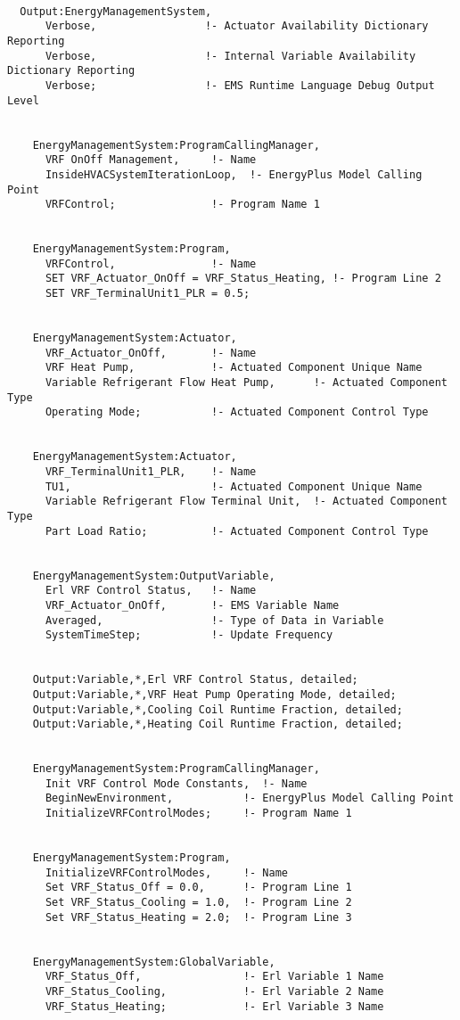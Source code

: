 \begin{lstlisting}

  Output:EnergyManagementSystem,
      Verbose,                 !- Actuator Availability Dictionary Reporting
      Verbose,                 !- Internal Variable Availability Dictionary Reporting
      Verbose;                 !- EMS Runtime Language Debug Output Level


    EnergyManagementSystem:ProgramCallingManager,
      VRF OnOff Management,     !- Name
      InsideHVACSystemIterationLoop,  !- EnergyPlus Model Calling Point
      VRFControl;               !- Program Name 1


    EnergyManagementSystem:Program,
      VRFControl,               !- Name
      SET VRF_Actuator_OnOff = VRF_Status_Heating, !- Program Line 2
      SET VRF_TerminalUnit1_PLR = 0.5;


    EnergyManagementSystem:Actuator,
      VRF_Actuator_OnOff,       !- Name
      VRF Heat Pump,            !- Actuated Component Unique Name
      Variable Refrigerant Flow Heat Pump,      !- Actuated Component Type
      Operating Mode;           !- Actuated Component Control Type


    EnergyManagementSystem:Actuator,
      VRF_TerminalUnit1_PLR,    !- Name
      TU1,                      !- Actuated Component Unique Name
      Variable Refrigerant Flow Terminal Unit,  !- Actuated Component Type
      Part Load Ratio;          !- Actuated Component Control Type


    EnergyManagementSystem:OutputVariable,
      Erl VRF Control Status,   !- Name
      VRF_Actuator_OnOff,       !- EMS Variable Name
      Averaged,                 !- Type of Data in Variable
      SystemTimeStep;           !- Update Frequency


    Output:Variable,*,Erl VRF Control Status, detailed;
    Output:Variable,*,VRF Heat Pump Operating Mode, detailed;
    Output:Variable,*,Cooling Coil Runtime Fraction, detailed;
    Output:Variable,*,Heating Coil Runtime Fraction, detailed;


    EnergyManagementSystem:ProgramCallingManager,
      Init VRF Control Mode Constants,  !- Name
      BeginNewEnvironment,           !- EnergyPlus Model Calling Point
      InitializeVRFControlModes;     !- Program Name 1


    EnergyManagementSystem:Program,
      InitializeVRFControlModes,     !- Name
      Set VRF_Status_Off = 0.0,      !- Program Line 1
      Set VRF_Status_Cooling = 1.0,  !- Program Line 2
      Set VRF_Status_Heating = 2.0;  !- Program Line 3


    EnergyManagementSystem:GlobalVariable,
      VRF_Status_Off,                !- Erl Variable 1 Name
      VRF_Status_Cooling,            !- Erl Variable 2 Name
      VRF_Status_Heating;            !- Erl Variable 3 Name
\end{lstlisting}
